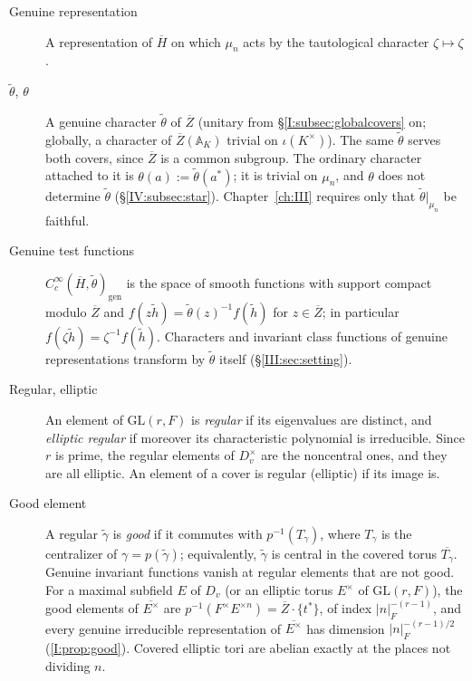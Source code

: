 \begin{description}
\item[Genuine representation] A representation of $\overline H$ on
which $\mu_n$ acts by the tautological character $\zeta\mapsto\zeta$.
\item[$\tilde\theta$, $\theta$] A genuine character $\tilde\theta$ of
$\overline Z$ (unitary from \S\ref{I:subsec:globalcovers} on; globally, a character of
$\overline Z(\mathbb A_K)$ trivial on $\iota(K^\times)$).  The same
$\tilde\theta$ serves both covers, since $\overline Z$ is a common
subgroup.  The ordinary character attached to it is
$\theta(a):=\tilde\theta(a^*)$; it is trivial on $\mu_n$, and
$\theta$ does not determine $\tilde\theta$ (\S\ref{IV:subsec:star}).
Chapter~\ref{ch:III} requires only that $\tilde\theta|_{\mu_n}$ be faithful.
\item[Genuine test functions] $C_c^\infty(\overline H,\tilde\theta)_{\mathrm{gen}}$
is the space of smooth functions with support compact modulo
$\overline Z$ and $f(z\tilde h)=\tilde\theta(z)^{-1}f(\tilde h)$ for
$z\in\overline Z$; in particular $f(\zeta\tilde h)=\zeta^{-1}f(\tilde h)$.
Characters and invariant class functions of genuine representations
transform by $\tilde\theta$ itself (\S\ref{III:sec:setting}).
\item[Regular, elliptic] An element of $\mathrm{GL}(r,F)$ is
\emph{regular} if its eigenvalues are distinct, and \emph{elliptic
regular} if moreover its characteristic polynomial is irreducible.
Since $r$ is prime, the regular elements of $D_v^\times$ are the
noncentral ones, and they are all elliptic.  An element of a cover is
regular (elliptic) if its image is.
\item[Good element] A regular $\tilde\gamma$ is \emph{good} if it
commutes with $p^{-1}(T_\gamma)$, where $T_\gamma$ is the centralizer
of $\gamma=p(\tilde\gamma)$; equivalently, $\tilde\gamma$ is central
in the covered torus $\overline{T_\gamma}$.  Genuine invariant
functions vanish at regular elements that are not good.  For a
maximal subfield $E$ of $D_v$ (or an elliptic torus $E^\times$ of
$\mathrm{GL}(r,F)$), the good elements of $\overline{E^\times}$ are
$p^{-1}(F^\times E^{\times n})=\overline Z\cdot\{t^*\}$, of index
$|n|_F^{-(r-1)}$, and every genuine irreducible representation of
$\overline{E^\times}$ has dimension $|n|_F^{-(r-1)/2}$ (\cref{I:prop:good}).  Covered elliptic tori are abelian exactly at the
places not dividing $n$.
\end{description}

